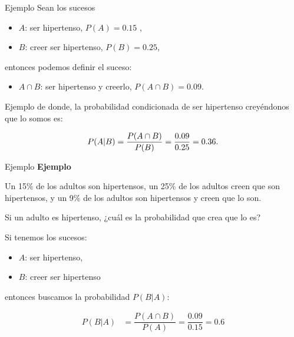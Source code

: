 \documentclass[
  ignorenonframetext,
  aspectratio=169]{beamer}
\providecommand{\tightlist}{%
  \setlength{\itemsep}{0pt}\setlength{\parskip}{0pt}}\usepackage{longtable,booktabs,array}
\begin{document}
\begin{frame}{Ejemplo}
\label{ejemplo-2}
Sean los sucesos

\begin{itemize}
\tightlist
\item
  \(A\): ser hipertenso, \(P(A)=0.15\) ,
\item
  \(B\): creer ser hipertenso, \(P(B)=0.25\),
\end{itemize}

entonces podemos definir el suceso:

\begin{itemize}
\tightlist
\item
  \(A\cap B\): ser hipertenso y creerlo, \(P(A\cap B)=0.09\).
\end{itemize}
\end{frame}

\begin{frame}{Ejemplo}
\label{ejemplo-3}
de donde, la probabilidad condicionada de ser hipertenso creyéndonos que
lo somos es:

\[\scriptsize P(A|B)=\dfrac{P(A\cap B)}{P(B)}=\dfrac{0.09}{0.25}=0.36.\]
\end{frame}

\begin{frame}{Ejemplo}
\label{ejemplo-4}
\textbf{Ejemplo}

Un 15\% de los adultos son hipertensos, un 25\% de los adultos creen que
son hipertensos, y un 9\% de los adultos son hipertensos y creen que lo
son.

Si un adulto es hipertenso, ¿cuál es la probabilidad que crea que lo es?

Si tenemos los sucesos:

\begin{itemize}
\tightlist
\item
  \(A\): ser hipertenso,
\item
  \(B\): creer ser hipertenso
\end{itemize}

entonces buscamos la probabilidad \(P(B|A)\):

\[
\begin{array}{rl}
P(B|A) & =\dfrac{P(A\cap B)}{P(A)}=\dfrac{0.09}{0.15}=
0.6
\end{array}
\]
\end{frame}
\end{document}
